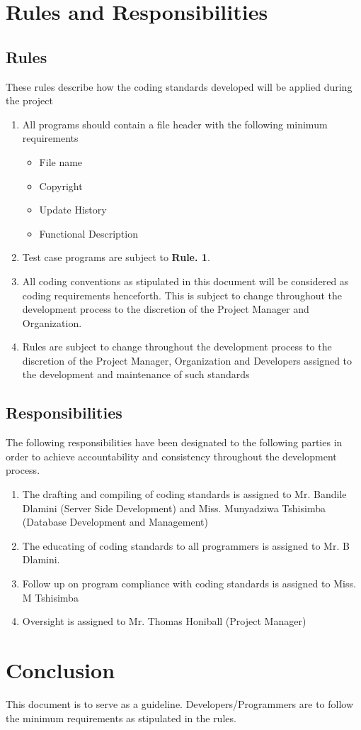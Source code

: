 \documentclass{article}
\begin{document}
\section{Rules and Responsibilities}
\subsection{Rules}
These rules describe how the coding standards developed will be applied during the project

\begin{enumerate}
    \item All programs should contain a file header with the following minimum requirements
    \begin{itemize}
        \item File name
        \item Copyright
        \item Update History
        \item Functional Description
    \end{itemize}{}
    
    \item Test case programs are subject to \textbf{Rule. 1}.
    \item All coding conventions as stipulated in this document will be considered as coding requirements henceforth. This is subject to change throughout the development process to the discretion of the Project Manager and Organization.
    \item Rules are subject to change throughout the development process to the discretion of the Project Manager, Organization and Developers assigned to the development and maintenance of such standards
\end{enumerate}

\subsection{Responsibilities}
The following responsibilities have been designated to the following parties in order to achieve accountability and consistency throughout the development process.

\begin{enumerate}
    \item The drafting and compiling of coding standards is assigned to Mr. Bandile Dlamini (Server Side Development) and Miss. Munyadziwa Tshisimba (Database Development and Management)
    \item The educating of coding standards to all programmers is assigned to Mr. B Dlamini.
    \item Follow up on program compliance with coding standards is assigned to Miss. M Tshisimba
    \item Oversight is assigned to Mr. Thomas Honiball (Project Manager)
\end{enumerate}
\section{Conclusion}

This document is to serve as a guideline. Developers/Programmers are to follow the minimum requirements as stipulated in the rules.

\printbibliography
\end{document}
